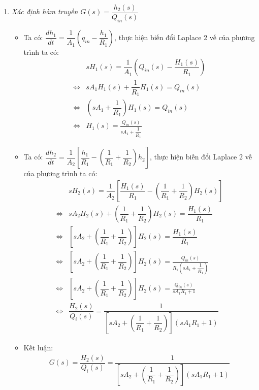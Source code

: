 \begin{enumerate}[\it a.]
        \item \textit{Xác định hàm truyền $G(s) = \dfrac{h_2(s)}{Q_{in}(s)}$}
            \begin{itemize}
                \item Ta có: $\dfrac{dh_1}{dt} = \dfrac{1}{A_1} \left({q_{in} - \dfrac{h_1}{R_1}}\right)$, thực hiện biến đổi Laplace 2 vế của phương trình ta có:
                    \begin{align}
                        & s H_1(s) = \dfrac{1}{A_1} \left({Q_{in}(s) - \dfrac{H_1(s)}{R_1}}\right)\\
                        \Longleftrightarrow & s A_1 H_1(s) + \dfrac{1}{R_1} H_1(s) = Q_{in}(s)\\
                        \Longleftrightarrow & \left({s A_1 + \dfrac{1}{R_1}}\right) H_1(s) = Q_{in}(s) \\
                        \Longleftrightarrow & H_1(s) = \frac{Q_{in}(s)}{s A_1 + \dfrac{1}{R_1}}
                    \end{align}

                \item Ta có: $\dfrac{dh_2}{dt} = \dfrac{1}{A_2} \left[{\dfrac{h_1}{R_1} - \left({\dfrac{1}{R_1} + \dfrac{1}{R_2}}\right) h_2}\right]$, thực hiện biến đổi Laplace 2 vế của phương trình ta có:
                    \begin{align}
                        & s H_2(s) = \dfrac{1}{A_2} \left[{\dfrac{H_1(s)}{R_1} - \left({\dfrac{1}{R_1} + \dfrac{1}{R_2}}\right) H_2(s)}\right] \\
                        \Longleftrightarrow & s A_2 H_2(s) + \left({\dfrac{1}{R_1} + \dfrac{1}{R_2}}\right) H_2(s) = \dfrac{H_1(s)}{R_1} \\
                        \Longleftrightarrow & \left[{s A_2 + \left({\dfrac{1}{R_1} + \dfrac{1}{R_2}}\right)}\right] H_2(s) = \dfrac{H_1(s)}{R_1}\\
                        \Longleftrightarrow & \left[{s A_2 + \left({\dfrac{1}{R_1} + \dfrac{1}{R_2}}\right)}\right] H_2(s) = \frac{Q_{in}(s)}{R_1 \left({s A_1 + \dfrac{1}{R_1}}\right)}\\
                        \Longleftrightarrow & \left[{s A_2 + \left({\dfrac{1}{R_1} + \dfrac{1}{R_2}}\right)}\right] H_2(s) = \frac{Q_{in}(s)}{s A_1 R_1 + 1} \\
                        \Longleftrightarrow & \dfrac{H_2(s)}{Q_i(s)} = \dfrac{1}{\left[{s A_2 + \left({\dfrac{1}{R_1} + \dfrac{1}{R_2}}\right)}\right] \left({s A_1 R_1 + 1}\right)}
                    \end{align}

                \item Kết luận:
                    \begin{align}
                        G(s) = \dfrac{H_2(s)}{Q_i(s)} = \dfrac{1}{\left[{s A_2 + \left({\dfrac{1}{R_1} + \dfrac{1}{R_2}}\right)}\right] \left({s A_1 R_1 + 1}\right)}
                    \end{align}
            \end{itemize}
    \end{enumerate}
